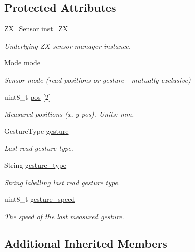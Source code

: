 \subsection*{Protected Attributes}
\begin{DoxyCompactItemize}
\item 
Z\+X\+\_\+\+Sensor \hyperlink{class_loom___z_x_gesture_a7b338ec49ed044f2b8faf13384dd19a1}{inst\+\_\+\+ZX}
\begin{DoxyCompactList}\small\item\em Underlying ZX sensor manager instance. \end{DoxyCompactList}\item 
\hyperlink{class_loom___z_x_gesture_a4c381d3f296be2cac6188fd8c5f8b7dd}{Mode} \hyperlink{class_loom___z_x_gesture_a06039a2e005fee4e1542534cc71b1316}{mode}
\begin{DoxyCompactList}\small\item\em Sensor mode (read positions or gesture -\/ mutually exclusive) \end{DoxyCompactList}\item 
uint8\+\_\+t \hyperlink{class_loom___z_x_gesture_aceb243194a3f03ca569ddbb4b41ef56c}{pos} \mbox{[}2\mbox{]}
\begin{DoxyCompactList}\small\item\em Measured positions (x, y pos). Units\+: mm. \end{DoxyCompactList}\item 
Gesture\+Type \hyperlink{class_loom___z_x_gesture_ad671101df307f96d5a8c1e281a3eaea9}{gesture}
\begin{DoxyCompactList}\small\item\em Last read gesture type. \end{DoxyCompactList}\item 
String \hyperlink{class_loom___z_x_gesture_afc1047aaf8abcbb6e9b155e2c025ddb9}{gesture\+\_\+type}
\begin{DoxyCompactList}\small\item\em String labelling last read gesture type. \end{DoxyCompactList}\item 
uint8\+\_\+t \hyperlink{class_loom___z_x_gesture_a9236f5979e3a46c0db2164bd343be305}{gesture\+\_\+speed}
\begin{DoxyCompactList}\small\item\em The speed of the last measured gesture. \end{DoxyCompactList}\end{DoxyCompactItemize}
\subsection*{Additional Inherited Members}


